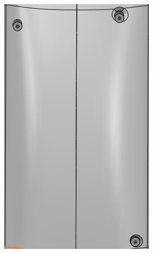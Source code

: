 \begin{figure}[!htbp]
\begin{subfigure}{.4\linewidth}
        \includegraphics[width=\linewidth]{assets/conception1/img214.jpg}
    \end{subfigure}
\end{figure}

\FloatBarrier


